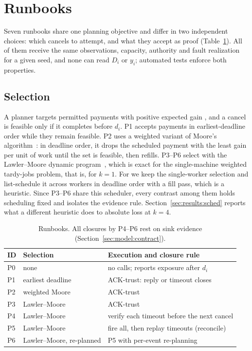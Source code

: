 \section{Runbooks}\label{sec:runbooks}

Seven runbooks share one planning objective and differ in two independent choices: which cancels to attempt, and what they accept as proof (Table~\ref{tab:runbooks}). All of them receive the same observations, capacity, authority and fault realization for a given seed, and none can read $D_i$ or $y_i$; automated tests enforce both properties.

\subsection{Selection}
A planner targets permitted payments with positive expected gain , and a cancel is feasible only if it completes before $d_i$. P1 accepts payments in earliest-deadline order while they remain feasible. P2 uses a weighted variant of Moore's algorithm~\cite{moore1968njob}: in deadline order, it drops the scheduled payment with the least gain per unit of work until the set is feasible, then refills. P3--P6 select with the Lawler--Moore dynamic program~\cite{lawler1969functional}, which is exact for the single-machine weighted tardy-jobs problem, that is, for $k = 1$. For  we keep the single-worker selection and list-schedule it across workers in deadline order with a fill pass, which is a heuristic. Since P3--P6 share this scheduler, every contrast among them holds scheduling fixed and isolates the evidence rule. Section~\ref{sec:results:sched} reports what a different heuristic does to absolute loss at $k = 4$.

\begin{table}[t]
\centering
\scriptsize
\setlength{\tabcolsep}{4pt}
\caption{Runbooks. All closures by P4--P6 rest on sink evidence (Section~\ref{sec:model:contract}).}
\label{tab:runbooks}
\begin{tabular}{@{}lll@{}}
\toprule
ID & Selection & Execution and closure rule \\
\midrule
P0 & none & no calls; reports exposure after $d_i$ \\
P1 & earliest deadline & ACK-trust: reply or timeout closes \\
P2 & weighted Moore & ACK-trust \\
P3 & Lawler--Moore & ACK-trust \\
P4 & Lawler--Moore & verify each timeout before the next cancel \\
P5 & Lawler--Moore & fire all, then replay timeouts (reconcile) \\
P6 & Lawler--Moore, re-planned & P5 with per-event re-planning \\
\bottomrule
\end{tabular}
\end{table}

